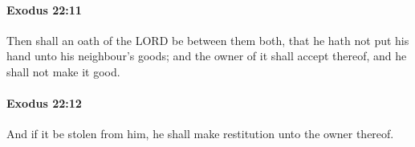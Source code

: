 		\paragraph{Exodus 22:11} %
			\label{EXODUS-22-11}

			Then shall an oath of the LORD be between them both, that he hath not put his hand unto his neighbour's goods; and the owner of it shall accept thereof, and he shall not make it good.


		\paragraph{Exodus 22:12} %
			\label{EXODUS-22-12}

			And if it be stolen from him, he shall make restitution unto the owner thereof.


